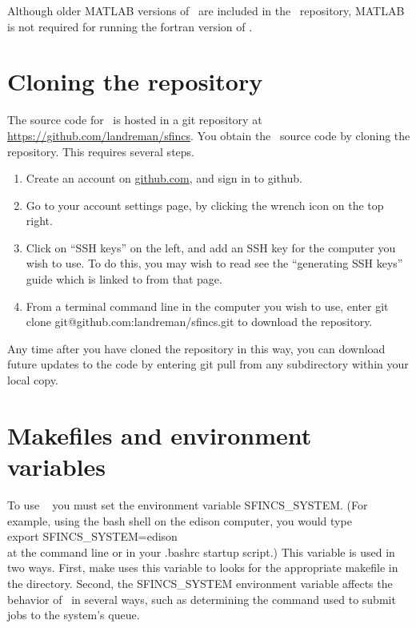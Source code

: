 Although older {\ttfamily MATLAB} versions of \sfincs~are included in the \sfincs~repository,
{\ttfamily MATLAB} is not required for running the fortran version of \sfincs.

\section{Cloning the repository}

The source code for \sfincs~is hosted in a {\ttfamily git} repository at
\url{https://github.com/landreman/sfincs}.
You obtain the \sfincs~source code by cloning the repository. This requires several steps.

\begin{enumerate}
\item Create an account on \url{github.com}, and sign in to {\ttfamily github}.
\item Go to your account settings page, by clicking the wrench icon on the top right.
\item Click on ``SSH keys'' on the left, and add an SSH key for the computer you wish to use. To do this, you may wish to read see the ``generating SSH keys'' guide which is linked to from that page.
\item From a terminal command line in the computer you wish to use, enter {\ttfamily git clone git@github.com:landreman/sfincs.git} to download the repository.
\end{enumerate}

Any time after you have cloned the repository in this way, you can download future updates to the code by entering {\ttfamily git pull} from any subdirectory within your local copy.

\section{Makefiles and environment variables}

To use \sfincs~ you must set the environment variable {\ttfamily SFINCS\_SYSTEM}.
(For example, using the {\ttfamily bash} shell on the {\ttfamily edison}
computer, you would type\\
{\ttfamily export SFINCS\_SYSTEM=edison}\\
 at the command line
or in your {\ttfamily .bashrc} startup script.)
This variable is used in two ways. 
First, {\ttfamily make} uses this variable to looks for the 
appropriate makefile in the
 directory.  Second, the {\ttfamily SFINCS\_SYSTEM} environment
variable affects the behavior of
\sfincsScan~in several ways, such as determining the command used to submit jobs to the system's queue.

